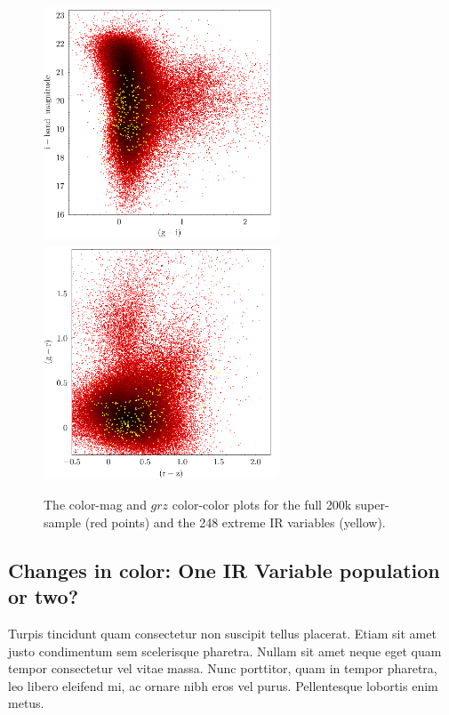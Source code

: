 \documentclass[apj]{emulateapj}
\begin{document}
    \begin{figure}
      \includegraphics[width=7.00cm, height=7.00cm, trim=0.0cm 0.0cm 0.0cm 0.0cm, clip]
      {../color_color/colormag_gr_imag_topcat.png}
      \includegraphics[width=7.00cm, height=7.00cm, trim=0.0cm 0.0cm 0.0cm 0.0cm, clip]
      {../color_color/colormag_grz_topcat.png}
      \centering
      \caption[]{The color-mag and $grz$ color-color plots for the full 200k super-sample (red points) 
        and the 248 extreme IR variables (yellow).}
      \label{fig:grz_colorcolor}
    \end{figure}

    \subsection{Changes in color: One IR Variable population or two?}
    Turpis tincidunt quam consectetur non suscipit tellus placerat. Etiam
    sit amet justo condimentum sem scelerisque pharetra. Nullam sit amet
    neque eget quam tempor consectetur vel vitae massa. Nunc porttitor,
    quam in tempor pharetra, leo libero eleifend mi, ac ornare nibh eros
    vel purus. Pellentesque lobortis enim metus.
\end{document}
